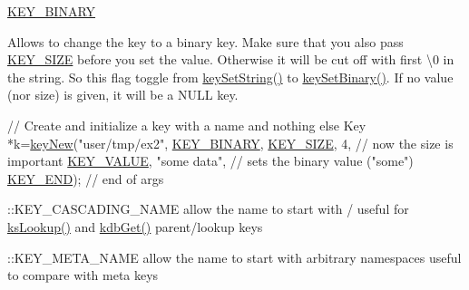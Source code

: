 \begin{DoxyItemize}
\item \hyperlink{group__key_gga91fb3178848bd682000958089abbaf40a1ca18d4e094ae7487d35ecedda2235ff}{K\-E\-Y\-\_\-\-B\-I\-N\-A\-R\-Y} \par
 Allows to change the key to a binary key. Make sure that you also pass \hyperlink{group__key_gga91fb3178848bd682000958089abbaf40a6d531b5c41445d19d0452eebdccbfa01}{K\-E\-Y\-\_\-\-S\-I\-Z\-E} before you set the value. Otherwise it will be cut off with first \textbackslash{}0 in the string. So this flag toggle from \hyperlink{group__keyvalue_ga622bde1eb0e0c4994728331326340ef2}{key\-Set\-String()} to \hyperlink{group__keyvalue_gaa50a5358fd328d373a45f395fa1b99e7}{key\-Set\-Binary()}. If no value (nor size) is given, it will be a N\-U\-L\-L key. 
\begin{DoxyCodeInclude}
\textcolor{comment}{// Create and initialize a key with a name and nothing else}
Key *k=\hyperlink{group__key_gad23c65b44bf48d773759e1f9a4d43b89}{keyNew}(\textcolor{stringliteral}{"user/tmp/ex2"},
        \hyperlink{group__key_gga91fb3178848bd682000958089abbaf40a1ca18d4e094ae7487d35ecedda2235ff}{KEY\_BINARY},
        \hyperlink{group__key_gga91fb3178848bd682000958089abbaf40a6d531b5c41445d19d0452eebdccbfa01}{KEY\_SIZE}, 4,               \textcolor{comment}{// now the size is important}
        \hyperlink{group__key_gga91fb3178848bd682000958089abbaf40ac66e4a49d09212b79f5754ca6db5bd2e}{KEY\_VALUE}, \textcolor{stringliteral}{"some data"},    \textcolor{comment}{// sets the binary value ("some")}
        \hyperlink{group__key_gga91fb3178848bd682000958089abbaf40aa8adb6fcb92dec58fb19410eacfdd403}{KEY\_END});                  \textcolor{comment}{// end of args}
\end{DoxyCodeInclude}

\item \-::\-K\-E\-Y\-\_\-\-C\-A\-S\-C\-A\-D\-I\-N\-G\-\_\-\-N\-A\-M\-E allow the name to start with / useful for \hyperlink{group__keyset_gaa34fc43a081e6b01e4120daa6c112004}{ks\-Lookup()} and \hyperlink{group__kdb_ga28e385fd9cb7ccfe0b2f1ed2f62453a1}{kdb\-Get()} parent/lookup keys
\item \-::\-K\-E\-Y\-\_\-\-M\-E\-T\-A\-\_\-\-N\-A\-M\-E allow the name to start with arbitrary namespaces useful to compare with meta keys
\end{DoxyItemize}

